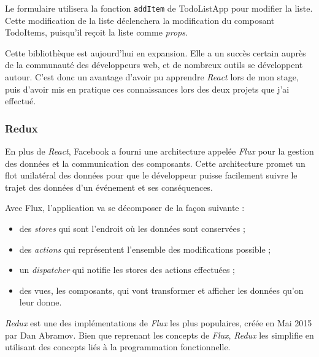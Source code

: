 \documentclass[12pt,a4paper]{article}
\providecommand{\tightlist}{%
  \setlength{\itemsep}{0pt}\setlength{\parskip}{0pt}}
\begin{document}
  Le formulaire utilisera la fonction \texttt{addItem} de TodoListApp pour
  modifier la liste. Cette modification de la liste déclenchera la
  modification du composant TodoItems, puisqu'il reçoit la liste comme
  \emph{props}.

  \bigskip

  Cette bibliothèque est aujourd'hui en expansion. Elle a un succès
  certain auprès de la communauté des développeurs web, et de nombreux
  outils se développent autour. C'est donc un avantage d'avoir pu
  apprendre \emph{React} lors de mon stage, puis d'avoir mis en pratique
  ces connaissances lors des deux projets que j'ai effectué.

  \bigskip

  \subsubsection{Redux}\label{redux}

  \bigskip

  En plus de \emph{React}, Facebook a fourni une architecture appelée
  \emph{Flux} pour la gestion des données et la communication des
  composants. Cette architecture promet un flot unilatéral des données
  pour que le développeur puisse facilement suivre le trajet des données
  d'un événement et ses conséquences.

  \bigskip

  Avec Flux, l'application va se décomposer de la façon suivante :

  \begin{itemize}
  \tightlist
  \item
    des \emph{stores} qui sont l'endroit où les données sont conservées ;
  \item
    des \emph{actions} qui représentent l'ensemble des modifications
    possible ;
  \item
    un \emph{dispatcher} qui notifie les stores des actions effectuées ;
  \item
    des vues, les composants, qui vont transformer et afficher les données
    qu'on leur donne.
  \end{itemize}

  \bigskip

  \emph{Redux} est une des implémentations de \emph{Flux} les plus
  populaires, créée en Mai 2015 par Dan Abramov. Bien que reprenant les
  concepts de \emph{Flux}, \emph{Redux} les simplifie en utilisant des
  concepts liés à la programmation fonctionnelle.
\end{document}
